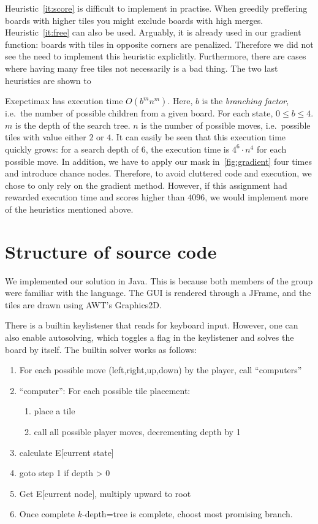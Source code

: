 \documentclass[journal]{IEEEtran}
\begin{document}
Heuristic~\ref{it:score} is difficult to implement in practise. When greedily preffering
boards with higher tiles you might exclude boards with high merges.
Heuristic~\ref{it:free} can also be used. Arguably, it is already used in our gradient
function: boards with tiles in opposite corners are penalized. Therefore we did
not see the need to implement this heuristic expliclitly. Furthermore, there are
cases where having many free tiles not necessarily is a bad thing.
The two last heuristics are shown to

Exepctimax has execution time $O(b^{m}n^{m})$. Here, $b$ is the \textit{branching factor},
i.e.\ the number of possible children from a given board. For each state, $0
\leq b \leq 4$.  $m$ is the depth of the search tree. $n$ is the number of possible
moves, i.e.\ possible tiles with value either $2$ or $4$. It can easily be seen
that this execution time quickly grows: for a search depth of 6, the execution
time is $4^{6}\cdot{n^{4}}$ for each possible move. In addition, we have to apply our mask
in~\autoref{fig:gradient} four times and introduce chance nodes. Therefore, to
avoid cluttered code and execution, we chose to only rely on the gradient
method. However, if this assignment had rewarded execution time and scores
higher than $4096$, we would implement more of the heuristics mentioned above.

\section*{Structure of source code}
We implemented our solution in Java. This is because both members of the group
were familiar with the language. The GUI is rendered through a JFrame, and the tiles are
drawn using AWT's Graphics2D.

There is a builtin keylistener that reads for keyboard input. However, one can also
enable autosolving, which toggles a flag in the keylistener and solves the board by
itself. The builtin solver works as follows:
\begin{framed}
\begin{enumerate}
    \item For each possible move (left,right,up,down) by the player, call ``computers''
    \item ``computer'': For each possible tile placement:
        \begin{enumerate}
            \item place a tile
            \item call all possible player moves,
                decrementing depth by 1
        \end{enumerate}
    \item calculate E[current state]
    \item \dotso{} goto step 1 if depth \textgreater{} 0
    \item Get E[current node], multiply upward to root
    \item Once complete $k$-depth=tree is complete, choost most promising branch.
\end{enumerate}
\end{framed}
\end{document}
